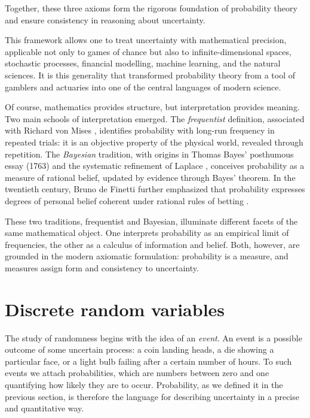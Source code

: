 \documentclass{book}
\begin{document}
Together, these three axioms form the rigorous foundation of probability theory and ensure consistency in reasoning about uncertainty.

\medskip

This framework allows one to treat uncertainty with mathematical precision, applicable not only to games of chance but also to infinite-dimensional spaces, stochastic processes, financial modelling, machine learning, and the natural sciences. It is this generality that transformed probability theory from a tool of gamblers and actuaries into one of the central languages of modern science.

\medskip

Of course, mathematics provides structure, but interpretation provides meaning. Two main schools of interpretation emerged. The \emph{frequentist} definition, associated with Richard von Mises \cite{vonmises1928}, identifies probability with long-run frequency in repeated trials: it is an objective property of the physical world, revealed through repetition. The \emph{Bayesian} tradition, with origins in Thomas Bayes’ posthumous essay (1763) \cite{bayes1763} and the systematic refinement of Laplace \cite{laplace1812}, conceives probability as a measure of rational belief, updated by evidence through Bayes’ theorem. In the twentieth century, Bruno de Finetti further emphasized that probability expresses degrees of personal belief coherent under rational rules of betting \cite{definetti1974}. 

\medskip

These two traditions, frequentist and Bayesian, illuminate different facets of the same mathematical object. One interprets probability as an empirical limit of frequencies, the other as a calculus of information and belief. Both, however, are grounded in the modern axiomatic formulation: probability is a measure, and measures assign form and consistency to uncertainty. 

\section{Discrete random variables}

The study of randomness begins with the idea of an \textit{event}. An event is a possible outcome of some uncertain process: a coin landing heads, a die showing a particular face, or a light bulb failing after a certain number of hours. To such events we attach probabilities, which are numbers between zero and one quantifying how likely they are to occur. Probability, as we defined it in the previous section, is therefore the language for describing uncertainty in a precise and quantitative way.
\end{document}
